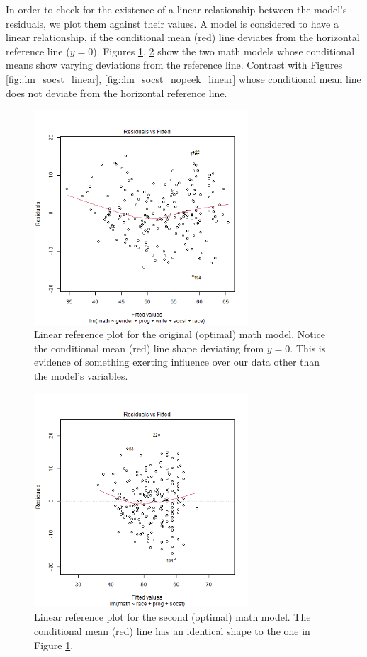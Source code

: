 \documentclass[10pt, a4paper]{article}
\begin{document}
	In order to check for the existence of a linear relationship between the model's residuals, we plot them against their values. A model is considered to have a linear relationship, if the conditional mean (red) line deviates from the horizontal reference line ($y=0$). Figures \ref{fig::lm_math_linear}, \ref{fig::lm_math_nopeek_linear} show the two math models whose conditional means show varying deviations from the reference line. Contrast with Figures \ref{fig::lm_socst_linear}, \ref{fig::lm_socst_nopeek_linear} whose conditional mean line does not deviate from the horizontal reference line.
	
	\begin{figure}
		\includegraphics[width=8cm]{lm_math_linear_plot.png}
		\centering
		\caption{Linear reference plot for the original (optimal) math model. Notice the conditional mean (red) line shape deviating from $y=0$. This is evidence of something exerting influence over our data other than the model's variables.}
		\label{fig::lm_math_linear}
	\end{figure}

	\begin{figure}
		\includegraphics[width=8cm]{lm_math_nopeek_linear_plot.png}
		\centering
		\caption{Linear reference plot for the second (optimal) math model. The conditional mean (red) line has an identical shape to the one in Figure \ref{fig::lm_math_linear}.}
		\label{fig::lm_math_nopeek_linear}
	\end{figure}
\end{document}
